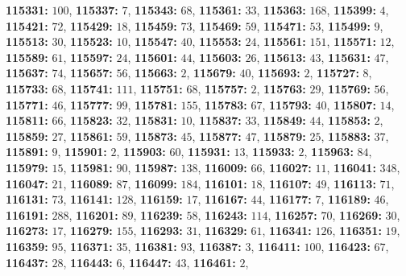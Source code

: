 \textsf{\bfseries 115331:} $100$, \textsf{\bfseries 115337:} $7$, \textsf{\bfseries 115343:} $68$, \textsf{\bfseries 115361:} $33$, \textsf{\bfseries 115363:} $168$, \textsf{\bfseries 115399:} $4$, \textsf{\bfseries 115421:} $72$, \textsf{\bfseries 115429:} $18$, \textsf{\bfseries 115459:} $73$, \textsf{\bfseries 115469:} $59$, \textsf{\bfseries 115471:} $53$, \textsf{\bfseries 115499:} $9$, \textsf{\bfseries 115513:} $30$, \textsf{\bfseries 115523:} $10$, \textsf{\bfseries 115547:} $40$, \textsf{\bfseries 115553:} $24$, \textsf{\bfseries 115561:} $151$, \textsf{\bfseries 115571:} $12$, \textsf{\bfseries 115589:} $61$, \textsf{\bfseries 115597:} $24$, \textsf{\bfseries 115601:} $44$, \textsf{\bfseries 115603:} $26$, \textsf{\bfseries 115613:} $43$, \textsf{\bfseries 115631:} $47$, \textsf{\bfseries 115637:} $74$, \textsf{\bfseries 115657:} $56$, \textsf{\bfseries 115663:} $2$, \textsf{\bfseries 115679:} $40$, \textsf{\bfseries 115693:} $2$, \textsf{\bfseries 115727:} $8$, \textsf{\bfseries 115733:} $68$, \textsf{\bfseries 115741:} $111$, \textsf{\bfseries 115751:} $68$, \textsf{\bfseries 115757:} $2$, \textsf{\bfseries 115763:} $29$, \textsf{\bfseries 115769:} $56$, \textsf{\bfseries 115771:} $46$, \textsf{\bfseries 115777:} $99$, \textsf{\bfseries 115781:} $155$, \textsf{\bfseries 115783:} $67$, \textsf{\bfseries 115793:} $40$, \textsf{\bfseries 115807:} $14$, \textsf{\bfseries 115811:} $66$, \textsf{\bfseries 115823:} $32$, \textsf{\bfseries 115831:} $10$, \textsf{\bfseries 115837:} $33$, \textsf{\bfseries 115849:} $44$, \textsf{\bfseries 115853:} $2$, \textsf{\bfseries 115859:} $27$, \textsf{\bfseries 115861:} $59$, \textsf{\bfseries 115873:} $45$, \textsf{\bfseries 115877:} $47$, \textsf{\bfseries 115879:} $25$, \textsf{\bfseries 115883:} $37$, \textsf{\bfseries 115891:} $9$, \textsf{\bfseries 115901:} $2$, \textsf{\bfseries 115903:} $60$, \textsf{\bfseries 115931:} $13$, \textsf{\bfseries 115933:} $2$, \textsf{\bfseries 115963:} $84$, \textsf{\bfseries 115979:} $15$, \textsf{\bfseries 115981:} $90$, \textsf{\bfseries 115987:} $138$, \textsf{\bfseries 116009:} $66$, \textsf{\bfseries 116027:} $11$, \textsf{\bfseries 116041:} $348$, \textsf{\bfseries 116047:} $21$, \textsf{\bfseries 116089:} $87$, \textsf{\bfseries 116099:} $184$, \textsf{\bfseries 116101:} $18$, \textsf{\bfseries 116107:} $49$, \textsf{\bfseries 116113:} $71$, \textsf{\bfseries 116131:} $73$, \textsf{\bfseries 116141:} $128$, \textsf{\bfseries 116159:} $17$, \textsf{\bfseries 116167:} $44$, \textsf{\bfseries 116177:} $7$, \textsf{\bfseries 116189:} $46$, \textsf{\bfseries 116191:} $288$, \textsf{\bfseries 116201:} $89$, \textsf{\bfseries 116239:} $58$, \textsf{\bfseries 116243:} $114$, \textsf{\bfseries 116257:} $70$, \textsf{\bfseries 116269:} $30$, \textsf{\bfseries 116273:} $17$, \textsf{\bfseries 116279:} $155$, \textsf{\bfseries 116293:} $31$, \textsf{\bfseries 116329:} $61$, \textsf{\bfseries 116341:} $126$, \textsf{\bfseries 116351:} $19$, \textsf{\bfseries 116359:} $95$, \textsf{\bfseries 116371:} $35$, \textsf{\bfseries 116381:} $93$, \textsf{\bfseries 116387:} $3$, \textsf{\bfseries 116411:} $100$, \textsf{\bfseries 116423:} $67$, \textsf{\bfseries 116437:} $28$, \textsf{\bfseries 116443:} $6$, \textsf{\bfseries 116447:} $43$, \textsf{\bfseries 116461:} $2$, 
